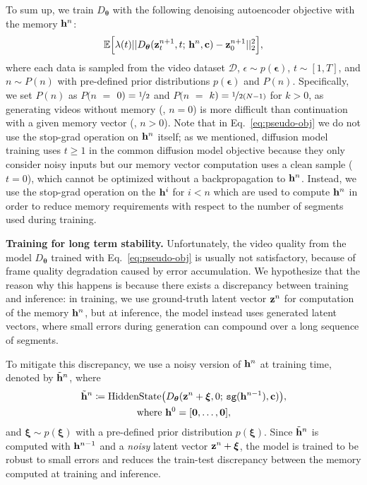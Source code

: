To sum up, we train $D_{\bm{\theta}}$ with the following denoising autoencoder objective with the memory $\mathbf{h}^{n}$:
\begin{align}
    \mathbb{E}
    \Big[
    \lambda(t)||D_{\bm{\theta}}(\mathbf{z}_t^{n+1}, t;\, \mathbf{h}^{n}, \mathbf{c}) - \mathbf{z}_0^{n+1}||_2^2 
    \Big],
\label{eq:pseudo-obj}
\end{align}
where each data is sampled from the video dataset $\mathcal{D}$, $\epsilon \sim p(\bm{\epsilon})$, $t \sim [1, T]$, and $n \sim P(n)$ with pre-defined prior distributions $p(\bm{\epsilon})$ and $P(n)$. 
Specifically, we set $P(n)$ as $P(n$ {$=$} $0)=\nicefrac{1}{2}$ and $P(n$ {$=$} $k)=\nicefrac{1}{2(N-1)}$ for $k>0$, as generating videos without memory (\ie, $n=0$) is more difficult than continuation with a given memory vector (\ie, $n>0$).
Note that in Eq.~\eqref{eq:pseudo-obj} we do not use the stop-grad operation on $\mathbf{h}^{n}$ itself; as we mentioned, diffusion model training uses $t \geq 1$ in the common diffusion model objective because they only consider noisy inputs but our memory vector computation uses a clean sample ($t=0$), which cannot be optimized without a backpropagation to $\mathbf{h}^{n}$. 
Instead, we use the stop-grad operation on the $\mathbf{h}^{i}$ for $i<n$ which are used to compute $\mathbf{h}^{n}$ in
order to reduce memory requirements with respect to the number of segments used during training.

\vspace{0.02in}
\noindent\textbf{Training for long term stability.}
Unfortunately, the video quality from the model $D_{\bm{\theta}}$ trained with Eq.~\eqref{eq:pseudo-obj} is usually not satisfactory, because of frame quality degradation caused by error accumulation. We hypothesize that the reason why this happens is because there exists a discrepancy between training and inference: in training, we use ground-truth latent vector $\mathbf{z}^{n}$ for computation of the memory $\mathbf{h}^{n}$, but at inference, the model instead uses generated latent vectors, 
where small errors during generation can compound over a long sequence of segments.

To mitigate this discrepancy, we use a noisy version of $\mathbf{h}^{n}$ at training time, denoted by $\tilde{\mathbf{h}}^{n}$,  where
\begin{gather}
    \tilde{\mathbf{h}}^{n} \coloneqq \mathrm{HiddenState}\big(D_{\bm{\theta}} (\mathbf{z}^{n} + \bm{\xi}, 0;\, \small{\mathtt{sg}}(\mathbf{h}^{n-1}), \mathbf{c})\big),\\ \text{where}\,\,\mathbf{h}^{0} = [\mathbf{0}, \ldots, \mathbf{0}],
\end{gather}
and $\bm{\xi} \sim p(\bm{\xi})$ with a pre-defined prior distribution $p(\bm{\xi})$. Since $\tilde{\mathbf{h}}^{n}$ is computed with $\mathbf{h}^{n-1}$ and a \emph{noisy} latent vector $\mathbf{z}^{n} + \bm{\xi}$, the model is trained to be robust to small errors and reduces the train-test discrepancy between the memory computed at training and inference. 

